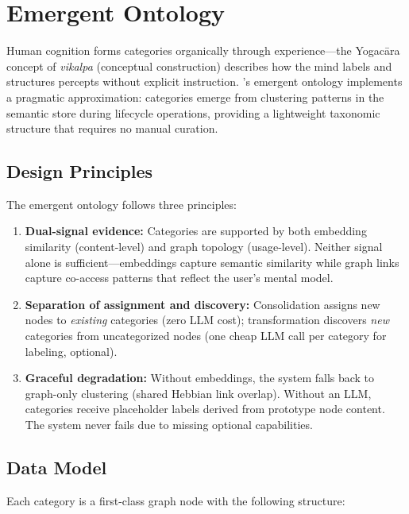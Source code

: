 \section{Emergent Ontology}
\label{sec:ontology}

Human cognition forms categories organically through experience---the
Yogac\=ara concept of \emph{vikalpa} (conceptual construction) describes how
the mind labels and structures percepts without explicit instruction.
\alaya{}'s emergent ontology implements a pragmatic approximation: categories
emerge from clustering patterns in the semantic store during lifecycle
operations, providing a lightweight taxonomic structure that requires no
manual curation.

\subsection{Design Principles}

The emergent ontology follows three principles:

\begin{enumerate}[nosep]
    \item \textbf{Dual-signal evidence:} Categories are supported by both
    embedding similarity (content-level) and graph topology (usage-level).
    Neither signal alone is sufficient---embeddings capture semantic
    similarity while graph links capture co-access patterns that reflect
    the user's mental model.

    \item \textbf{Separation of assignment and discovery:} Consolidation
    assigns new nodes to \emph{existing} categories (zero LLM cost);
    transformation discovers \emph{new} categories from uncategorized nodes
    (one cheap LLM call per category for labeling, optional).

    \item \textbf{Graceful degradation:} Without embeddings, the system
    falls back to graph-only clustering (shared Hebbian link overlap).
    Without an LLM, categories receive placeholder labels derived from
    prototype node content. The system never fails due to missing optional
    capabilities.
\end{enumerate}

\subsection{Data Model}

Each category is a first-class graph node with the following structure:

